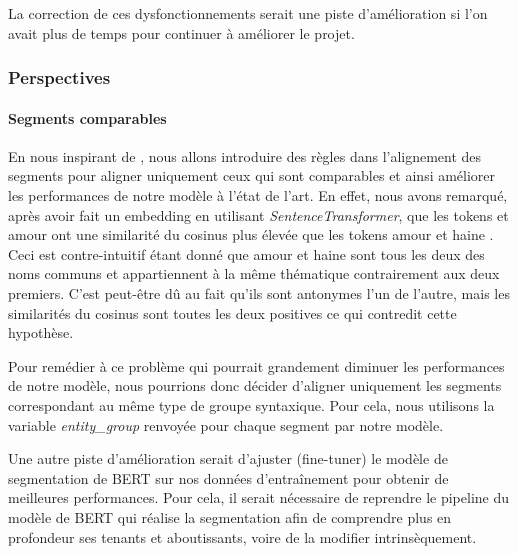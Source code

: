 \documentclass[a4paper, twoside, 11pt]{article}
\begin{document}
La correction de ces dysfonctionnements serait une piste d'amélioration si l'on avait plus de temps pour continuer à améliorer le projet.

 \subsubsection{Perspectives}
 \paragraph{Segments comparables}
       \hfill \break
En nous inspirant de \cite{banjade}, nous allons introduire des règles dans l’alignement des segments pour aligner uniquement ceux qui sont \og comparables \fg{} et ainsi améliorer les performances de notre modèle à l'état de l'art. En effet, nous avons remarqué, après avoir fait un \og embedding \fg{} en utilisant \textit{SentenceTransformer}, que les tokens  \fg{} et \og amour \fg{} ont une similarité du cosinus plus élevée que les tokens \og amour \fg{} et  \og haine \fg{}. Ceci est contre-intuitif étant donné que \og amour \fg{} et \og haine \fg{} sont tous les deux des noms communs et appartiennent à la même thématique contrairement aux deux premiers. C'est peut-être dû au fait qu'ils sont antonymes l’un de l’autre, mais les similarités du cosinus sont toutes les deux positives ce qui contredit cette hypothèse.

Pour remédier à ce problème qui pourrait grandement diminuer les performances de notre modèle, nous pourrions donc décider d'aligner uniquement les segments correspondant au même type de groupe syntaxique. Pour cela, nous utilisons la variable \textit{entity\_group} renvoyée pour chaque segment par notre modèle.

 Une autre piste d'amélioration serait d'ajuster (fine-tuner) le modèle de segmentation de BERT sur nos données d'entraînement pour obtenir de meilleures performances. Pour cela, il serait nécessaire de reprendre le pipeline du modèle de BERT qui réalise la segmentation afin de comprendre plus en profondeur ses tenants et aboutissants, voire de la modifier intrinsèquement.
    \printbibliography
\end{document}

